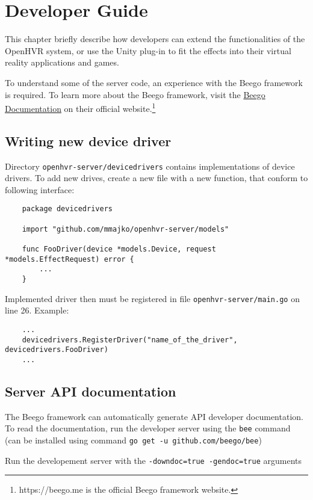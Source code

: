 \chapter{Developer Guide}

This chapter briefly describe how developers can extend the functionalities
of the OpenHVR system, or use the Unity plug-in to fit the effects 
into their virtual reality applications and games.

To understand some of the server code, an experience with the Beego framework
is required. To learn more about the Beego framework, visit the
\hyperlink{https://beego.me/docs/intro/}{Beego Documentation} on their official
website.\footnote{https://beego.me is the official Beego framework website.}

\section{Writing new device driver}

Directory \verb|openhvr-server/devicedrivers| contains implementations of
device drivers. To add new drives, create a new file with a new function,
that conform to following interface:

\begin{verbatim}
    package devicedrivers

    import "github.com/mmajko/openhvr-server/models"

    func FooDriver(device *models.Device, request *models.EffectRequest) error {
        ...
    }
\end{verbatim}

Implemented driver then must be registered in file \verb|openhvr-server/main.go|
on line 26. Example:

\begin{verbatim}
    ...
    devicedrivers.RegisterDriver("name_of_the_driver", devicedrivers.FooDriver)
    ...
\end{verbatim}

\section{Server API documentation}

The Beego framework can automatically generate API developer documentation.
To read the documentation, run the developer server using the \verb|bee| command
(can be installed using command \verb|go get -u github.com/beego/bee|)

Run the developement server with the \verb|-downdoc=true -gendoc=true| arguments

